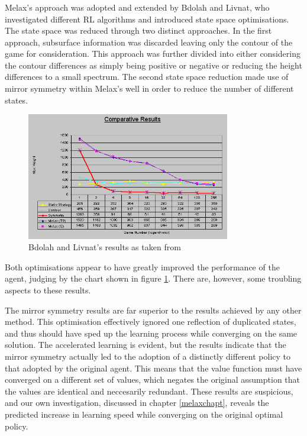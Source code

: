 \documentclass{rucsthesis}
\begin{document}
\subsubsection{\cite{yaeltetris}}

Melax's approach was adopted and extended by Bdolah and Livnat, who investigated different RL algorithms and introduced state space optimisations. The state space was reduced through two distinct approaches. In the first approach, subsurface information was discarded leaving only the contour of the game for consideration. This approach was further divided into either considering the contour differences as simply being positive or negative or reducing the height differences to a small spectrum. The second state space reduction made use of mirror symmetry within Melax's well in order to reduce the number of different states.

\begin{figure}[h]
\centering
\includegraphics[width=3.5in]{results.png}
\caption{Bdolah and Livnat's results as taken from \cite{yaeltetris}}
\label{fig:yaelres}
\end{figure}

Both optimisations appear to have greatly improved the performance of the agent, judging by the chart shown in figure \ref{fig:yaelres}. There are, however, some troubling aspects to these results.

The mirror symmetry results are far superior to the results achieved by any other method. This optimisation effectively ignored one reflection of duplicated states, and thus should have sped up the learning process while converging on the same solution. The accelerated learning is evident, but the results indicate that the mirror symmetry actually led to the adoption of a distinctly different policy to that adopted by the original agent. This means that the value function must have converged on a different set of values, which negates the original assumption that the values are identical and neccesarily redundant. These results are suspicious, and our own investigation, discussed in chapter \ref{melaxchapt}, reveals the predicted increase in learning speed while converging on the original optimal policy.
\end{document}
